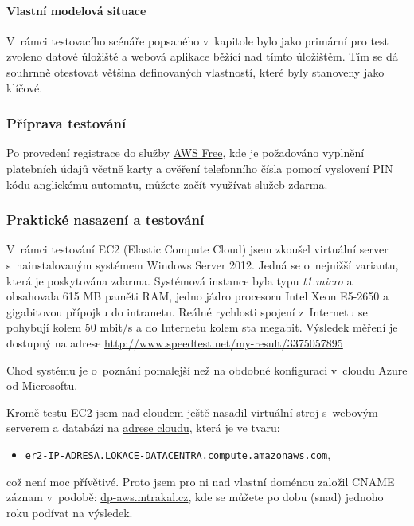 \paragraph{Vlastní modelová situace}
V~rámci testovacího scénáře popsaného v~kapitole  bylo jako primární pro test zvoleno datové úložiště a webová aplikace běžící nad tímto úložištěm. Tím se dá souhrnně otestovat většina definovaných vlastností, které byly stanoveny jako klíčové.

\subsubsection{Příprava testování}
Po provedení registrace do služby \href{https://aws.amazon.com/free/}{AWS Free}, kde je požadováno vyplnění platebních údajů včetně karty a ověření telefonního čísla pomocí vyslovení PIN kódu anglickému automatu, můžete začít využívat služeb zdarma.

\subsubsection{Praktické nasazení a testování}
V~rámci testování EC2 (Elastic Compute Cloud) jsem zkoušel virtuální server s~nainstalovaným systémem Windows Server 2012. Jedná se o~nejnižší variantu, která je poskytována zdarma. Systémová instance byla typu \textit{t1.micro} a obsahovala 615 MB paměti RAM, jedno jádro procesoru Intel Xeon E5-2650 a gigabitovou přípojku do intranetu. Reálné rychlosti spojení z~Internetu se pohybují kolem 50 mbit/s a do Internetu kolem sta megabit. Výsledek měření je dostupný na adrese \href{http://www.speedtest.net/my-result/3375057895}{http://www.speedtest.net/my-result/3375057895}

Chod systému je o~poznání pomalejší než na obdobné konfiguraci v~cloudu Azure od Microsoftu.

Kromě testu EC2 jsem nad cloudem ještě nasadil virtuální stroj s~webovým serverem a databází na \href{http://ec2-54-186-102-209.us-west-2.compute.amazonaws.com/}{adrese cloudu}, která je ve tvaru:
\begin{itemize}
	\item \texttt{er2-IP-ADRESA.LOKACE-DATACENTRA.compute.amazonaws.com},
\end{itemize}
což není moc přívětivé. Proto jsem pro ni nad vlastní doménou založil CNAME záznam v~podobě: \href{http://dp-aws.mtrakal.cz}{dp-aws.mtrakal.cz}, kde se můžete po dobu (snad) jednoho roku podívat na výsledek.

